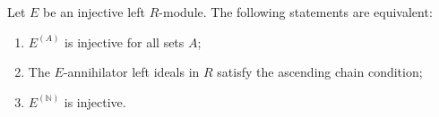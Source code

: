Let $E$ be an injective left $R$-module. The following statements are equivalent:

\begin{enumerate}
\item[(a)] $E^{(A)}$ is injective for all sets $A$;
\item[(b)] The $E$-annihilator left ideals in $R$ satisfy the ascending chain condition;
\item[(c)] $E^{(\mathbb{N})}$ is injective.
\end{enumerate}
